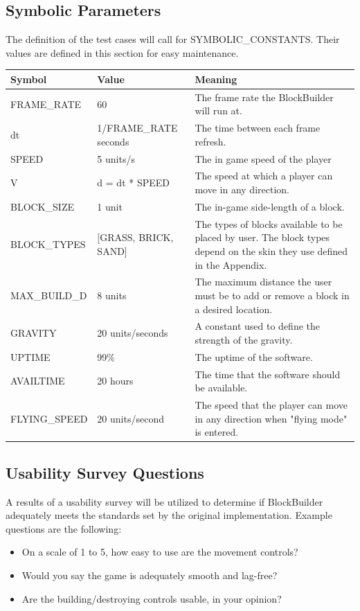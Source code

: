 \documentclass[12pt, titlepage]{article}
\begin{document}
\newpage

\subsection{Symbolic Parameters}


The definition of the test cases will call for SYMBOLIC\_CONSTANTS.
Their values are defined in this section for easy maintenance.

\begin{tabular}{ |p{3cm}|p{3cm}|p{7cm}|  }
\hline
 Symbol & Value & Meaning\\
 \hline
 FRAME\_RATE & 60  & The frame rate the BlockBuilder will run at.\\
 \hline
 dt & 1/FRAME\_RATE seconds  & The time between each frame refresh.\\
 \hline
 SPEED & 5 units/s & The in game speed of the player \\
 \hline
 V & d = dt * SPEED  & The speed at which a player can move in any direction. \\
 \hline
 BLOCK\_SIZE & 1 unit  & The in-game side-length of a block.\\
 \hline
BLOCK\_TYPES & [GRASS, BRICK, SAND] & The types of blocks available to be placed by user. The block types depend on the skin they use defined in the Appendix.\\
 \hline
MAX\_BUILD\_D & 8 units  & The maximum distance the user must be to add or remove a block in a desired location.\\
 \hline
GRAVITY & 20 units/seconds  & A constant used to define the strength of the gravity.\\
 \hline
 UPTIME &99\%  & The uptime of the software.\\
 \hline
  AVAILTIME & 20 hours  & The time that the software should be available.\\
 \hline
   FLYING\_SPEED & 20 units/second  & The speed that the player can move in any direction when "flying mode" is entered.\\
 \hline
\end{tabular}

\subsection{Usability Survey Questions}

A results of a usability survey will be utilized to determine if BlockBuilder adequately meets the standards set by the original implementation. Example questions are the following:

\begin{itemize}
    \item On a scale of 1 to 5, how easy to use are the movement controls?
    \item Would you say the game is adequately smooth and lag-free?
    \item Are the building/destroying controls usable, in your opinion?
\end{itemize}
\end{document}
